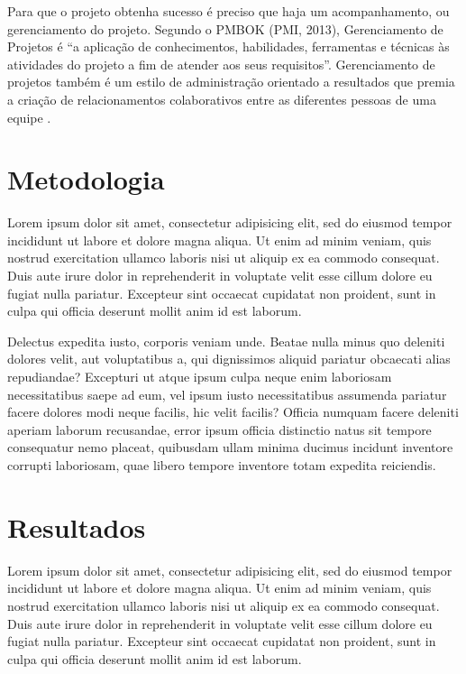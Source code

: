 \documentclass[
    12pt,               %
    openright,          %
    twoside,            %
    a4paper,            %
    chapter=TITLE,     %
    english,            %
    spanish,            %
    portuguese              %
    ]{abntex2}
\newcommand\dblquote[1]{\textquotedblleft #1\textquotedblright}
\begin{document}
Para que o projeto obtenha sucesso é preciso que haja um acompanhamento, ou gerenciamento do projeto. Segundo o PMBOK (PMI, 2013), Gerenciamento de Projetos é \dblquote{a aplicação de conhecimentos, habilidades, ferramentas e técnicas às atividades do projeto a fim de atender aos seus requisitos}. Gerenciamento de projetos também é um estilo de administração orientado a resultados que premia a criação de relacionamentos colaborativos entre as diferentes pessoas de uma equipe \cite[p.~3]{grayLarson2009}.



\chapter{Metodologia}

Lorem ipsum dolor sit amet, consectetur adipisicing elit, sed do eiusmod tempor incididunt ut labore et dolore magna aliqua. Ut enim ad minim veniam, quis nostrud exercitation ullamco laboris nisi ut aliquip ex ea commodo consequat. Duis aute irure dolor in reprehenderit in voluptate velit esse cillum dolore eu fugiat nulla pariatur. Excepteur sint occaecat cupidatat non proident, sunt in culpa qui officia deserunt mollit anim id est laborum.


Delectus expedita iusto, corporis veniam unde. Beatae nulla minus quo deleniti dolores velit, aut voluptatibus a, qui dignissimos aliquid pariatur obcaecati alias repudiandae? Excepturi ut atque ipsum culpa neque enim laboriosam necessitatibus saepe ad eum, vel ipsum iusto necessitatibus assumenda pariatur facere dolores modi neque facilis, hic velit facilis? Officia numquam facere deleniti aperiam laborum recusandae, error ipsum officia distinctio natus sit tempore consequatur nemo placeat, quibusdam ullam minima ducimus incidunt inventore corrupti laboriosam, quae libero tempore inventore totam expedita reiciendis.



\chapter{Resultados}

Lorem ipsum dolor sit amet, consectetur adipisicing elit, sed do eiusmod tempor incididunt ut labore et dolore magna aliqua. Ut enim ad minim veniam, quis nostrud exercitation ullamco laboris nisi ut aliquip ex ea commodo consequat. Duis aute irure dolor in reprehenderit in voluptate velit esse cillum dolore eu fugiat nulla pariatur. Excepteur sint occaecat cupidatat non proident, sunt in culpa qui officia deserunt mollit anim id est laborum.
\end{document}
